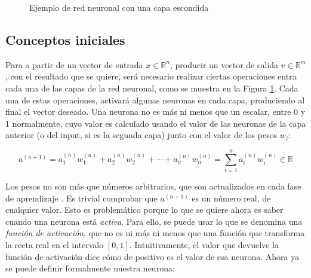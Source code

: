 \begin{figure}[H]
    \centering
    \caption{Ejemplo de red neuronal con una capa escondida}
    \label{redneuronal:1}
\end{figure}

\subsection{Conceptos iniciales}

Para a partir de un vector de entrada $x\in\mathbb{R}^n$, producir un vector de salida $v\in\mathbb{R}^m$,
con el resultado que se quiere, será necesario realizar ciertas operaciones entra cada una de las capas
de la red neuronal, como se muestra en la Figura \ref{redneuronal:1}. Cada una de estas operaciones, activará
algunas neuronas en cada capa, produciendo al final el vector deseado. Una neurona no es más ni menos
que un escalar, entre 0 y 1 normalmente, cuyo valor es calculado usando el valor de las neuronas de la
capa anterior (o del input, si es la segunda capa) junto con el valor de los pesos $w_i$:

\[
    a^{(n+1)} = a^{(n)}_1w^{(n)}_1+a^{(n)}_2w^{(n)}_2+\cdots+a^{(n)}_nw^{(n)}_n=\sum_{i=1}^na^{(n)}_iw^{(n)}_i\in\mathbb{R}
\]

Los pesos no son más que números arbitrarios, que son actualizados en cada fase de aprendizaje \cite{rumelhart1986learning}.
Es trivial comprobar que $a^{(n+1)}$ es un número real, de cualquier valor. Esto es problemático porque
lo que se quiere ahora es saber cuando una neurona está \textit{activa}. Para ello, se puede usar lo
que se denomina una \textit{función de activación}, que no es ni más ni menos que una función  que transforma
la recta real en el intervalo $[0,1]$. Intuitivamente, el valor que devuelve la función de activación dice
cómo de positivo es el valor de esa neurona. Ahora ya se puede definir formalmente nuestra neurona:

